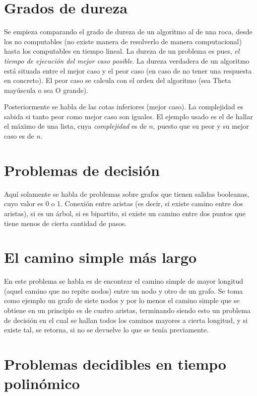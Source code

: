 \documentclass[a4paper]{article}
\begin{document}
\section{Grados de dureza}

Se empieza comparando el grado de dureza de un algoritmo al de una roca, desde los no computables (no existe manera de resolverlo de manera computacional) hasta los computables en tiempo lineal. La dureza de un problema es pues, \textit{el tiempo de ejecución del mejor caso posible}. La dureza verdadera de un algoritmo está situada entre el mejor caso y el peor caso (en caso de no tener una respuesta en concreto). El peor caso se calcula con el orden del algoritmo (sea Theta mayúscula o sea O grande). 

Posteriormente se habla de las cotas inferiores (mejor caso). La complejidad es sabida si tanto peor como mejor caso son iguales. El ejemplo usado es el de hallar el máximo de una lista, cuya \textit{complejidad} es de \(n\), puesto que su peor y su mejor caso es de \(n\).

\section{Problemas de decisión}

Aquí solamente se habla de problemas sobre grafos que tienen salidas booleanas, cuyo valor es 0 o 1. Conexión entre aristas (es decir, si existe camino entre dos aristas), si es un árbol, si es bipartito, si existe un camino entre dos puntos que tiene menos de cierta cantidad de pasos.

\section{El camino simple más largo}

En este problema se habla es de encontrar el camino simple de mayor longitud (aquel camino que no repite nodos) entre un nodo y otro de un grafo. Se toma como ejemplo un grafo de siete nodos y por lo menos el camino simple que se obtiene en un principio es de cuatro aristas, terminando siendo esto un problema de decisión en el cual se hallan todos los caminos mayores a cierta longitud, y si existe tal, se retorna, si no se devuelve lo que se tenía previamente. 

\section{Problemas decidibles en tiempo polinómico}
\end{document}
